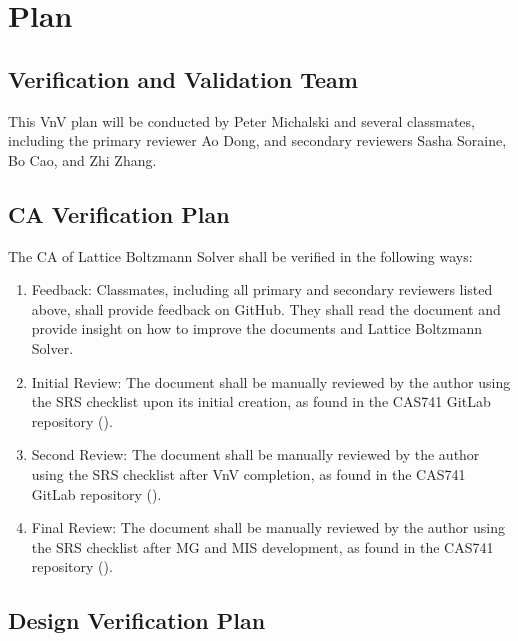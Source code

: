 \documentclass[12pt, titlepage]{article}
\newcommand{\famname}{Lattice Boltzmann Solver}
\begin{document}
\section{Plan}
\label{testplan}	
\subsection{Verification and Validation Team}

This VnV plan will be conducted by Peter Michalski and several
classmates, including the primary reviewer Ao Dong, and secondary reviewers Sasha Soraine, Bo Cao, and Zhi Zhang. %

\subsection{CA Verification Plan}

The CA of {\famname} shall be verified in the following ways:

\begin{enumerate}
\item Feedback: Classmates, including all primary and secondary reviewers listed above, shall provide feedback on GitHub. They shall read the document and provide insight on how to improve the documents and {\famname}. %
\item Initial Review: The document shall be manually reviewed by the author
  using the SRS checklist upon its initial creation, as found in the CAS741
  GitLab repository (\citet{CAS741_SRS_checklist}). %
\item Second Review: The document shall be manually reviewed by the author using
  the SRS checklist after VnV completion, as found in the CAS741 GitLab
  repository (\citet{CAS741_SRS_checklist}). %
\item Final Review: The document shall be manually reviewed by the author using
  the SRS checklist after MG and MIS development, as found in the CAS741
  repository (\citet{CAS741_SRS_checklist}). %
\end{enumerate}

\subsection{Design Verification Plan}
\end{document}
